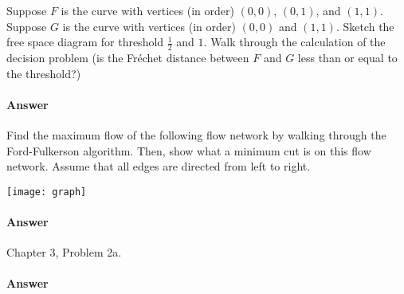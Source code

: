 \documentclass{article}
\begin{document}
\collab{\todo{}}

Suppose $F$ is the curve with vertices (in order) $(0,0)$, $(0,1)$, and $(1,1)$.
Suppose $G$ is the curve with vertices (in order) $(0,0)$ and $(1,1)$.  Sketch
the free space diagram for threshold $\frac{1}{2}$ and $1$.  Walk through the
calculation of the decision problem (is the Fr\'echet distance between $F$ and
$G$ less than or equal to the threshold?)

\paragraph{Answer}


\collab{\todo{}}

Find the maximum flow of the following flow network by walking through the
Ford-Fulkerson algorithm.  Then, show what a minimum cut is on this flow
network.  Assume that all edges are directed from left to right.

\vspace{1in}
\texttt{[image: graph]}

\paragraph{Answer}


\collab{\todo{}}

Chapter 3, Problem 2a.

\paragraph{Answer}

\end{document}

